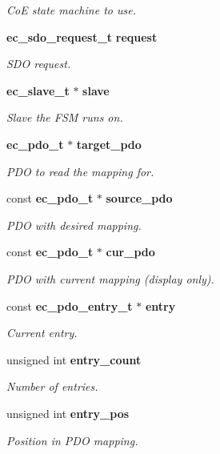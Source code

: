 \begin{DoxyCompactItemize}
\begin{DoxyCompactList}\small\item\em Co\-E state machine to use. \end{DoxyCompactList}\item 
{\bf ec\-\_\-sdo\-\_\-request\-\_\-t} {\bf request}
\begin{DoxyCompactList}\small\item\em S\-D\-O request. \end{DoxyCompactList}\item 
{\bf ec\-\_\-slave\-\_\-t} $\ast$ {\bf slave}
\begin{DoxyCompactList}\small\item\em Slave the F\-S\-M runs on. \end{DoxyCompactList}\item 
{\bf ec\-\_\-pdo\-\_\-t} $\ast$ {\bf target\-\_\-pdo}
\begin{DoxyCompactList}\small\item\em P\-D\-O to read the mapping for. \end{DoxyCompactList}\item 
const {\bf ec\-\_\-pdo\-\_\-t} $\ast$ {\bf source\-\_\-pdo}
\begin{DoxyCompactList}\small\item\em P\-D\-O with desired mapping. \end{DoxyCompactList}\item 
const {\bf ec\-\_\-pdo\-\_\-t} $\ast$ {\bf cur\-\_\-pdo}
\begin{DoxyCompactList}\small\item\em P\-D\-O with current mapping (display only). \end{DoxyCompactList}\item 
const {\bf ec\-\_\-pdo\-\_\-entry\-\_\-t} $\ast$ {\bf entry}
\begin{DoxyCompactList}\small\item\em Current entry. \end{DoxyCompactList}\item 
unsigned int {\bf entry\-\_\-count}
\begin{DoxyCompactList}\small\item\em Number of entries. \end{DoxyCompactList}\item 
unsigned int {\bf entry\-\_\-pos}
\begin{DoxyCompactList}\small\item\em Position in P\-D\-O mapping. \end{DoxyCompactList}\end{DoxyCompactItemize}


